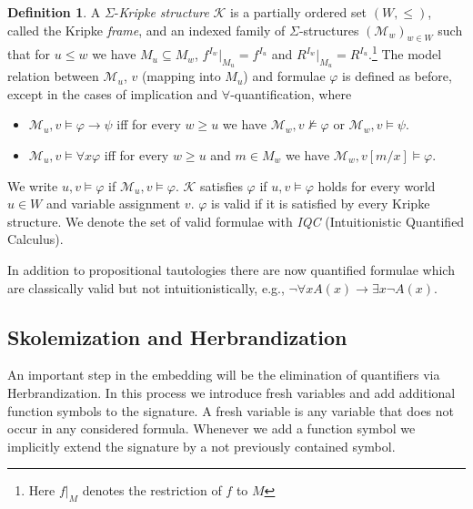 \documentclass{easychair}
\theoremstyle{definition}
\theoremstyle{definition}
\theoremstyle{definition}
\theoremstyle{definition}
\theoremstyle{definition}
\newtheorem{definition}[theorem]{Definition}
\theoremstyle{definition}
\theoremstyle{definition}
\begin{document}
\begin{definition}
	A $\Sigma$-\emph{Kripke structure} $\mathcal{K}$ is a partially ordered set $(W, \leq)$, called the Kripke \emph{frame}, and an indexed family of $\Sigma$-structures $(\mathcal{M}_w)_{w\in W}$ such that for $u\leq w$ we have $M_u\subseteq M_w$, $f^{I_w}|_{M_u} = f^{I_u}$ and $R^{I_w}|_{M_u} = R^{I_u}$.\footnote{Here $f|_M$ denotes the restriction of $f$ to $M$}
	The model relation between $\mathcal M_u$, $v$ (mapping into $M_u$) and formulae $\varphi$ is defined as before, except in the cases of implication and $\forall$-quantification, where
	\begin{itemize}
		\item $\mathcal M_u, v\models \varphi\to\psi$ iff for every $w\geq u$ we have $\mathcal M_w, v\not\models\varphi$ or $\mathcal M_w, v\models\psi$.
		\item $\mathcal M_u, v\models\forall x\varphi$ iff for every $w\geq u$ and $m\in M_w$ we have $\mathcal M_w, v[m/x]\models\varphi$.
	\end{itemize}
	We write $u, v\models\varphi$ if $\mathcal M_u, v\models \varphi$. $\mathcal{K}$ satisfies $\varphi$ if $u, v\models\varphi$ holds for every world $u\in W$ and variable assignment $v$. $\varphi$ is valid if it is satisfied by every Kripke structure.
	We denote the set of valid formulae with \emph{IQC} (Intuitionistic Quantified Calculus).
\end{definition}
In addition to propositional tautologies there are now quantified formulae which are classically valid but not intuitionistically, e.g., $\neg\forall x A(x)\to \exists x \neg A(x)$.

\subsection{Skolemization and Herbrandization}\label{section:herbrandiaztion}

An important step in the embedding will be the elimination of quantifiers via Herbrandization.
In this process we introduce fresh variables and add additional function symbols to the signature.
A fresh variable is any variable that does not occur in any considered formula.
Whenever we add a function symbol we implicitly extend the signature by a not previously contained symbol.
\end{document}
